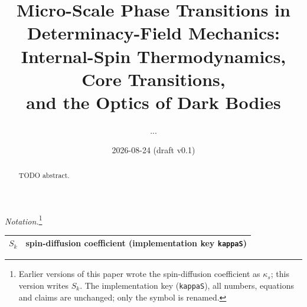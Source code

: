 \documentclass[aps,reprint,amsmath,amssymb,nofootinbib,superscriptaddress,floatfix]{revtex4-2}
\begin{document}
\title{Micro-Scale Phase Transitions in Determinacy-Field Mechanics:\\
Internal-Spin Thermodynamics, Core Transitions,\\
and the Optics of Dark Bodies}

\author{...}
\date{2026-08-24 (draft v0.1)}

\begin{abstract}
TODO abstract.
\end{abstract}

\maketitle

\noindent\textit{Notation.}\footnote{Earlier versions of this paper wrote the spin-diffusion coefficient as $\kappa_s$; this version writes $S_k$. The implementation key (\texttt{kappaS}), all numbers, equations and claims are unchanged; only the symbol is renamed.}
\begin{center}
\small
\begin{tabular}{@{}lp{}@{}}
\hline
$S_k$ & spin-diffusion coefficient (implementation key \texttt{kappaS}) \\
\hline
\end{tabular}
\end{center}
\end{document}
